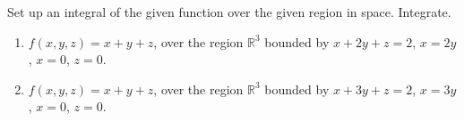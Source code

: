 Set up an integral of the given function over the given region in space. Integrate.
\begin{enumerate}
\item $f(x,y,z)=x+y+z$, over the region $\mathbb R^3$ bounded by $ x + 2y+z=2$, $x=2y$, $x=0$, $z=0$.
\item \label{problemIntegratex+y+zoverx+3y+z=2,x=0,z=0,x=3y} $f(x,y,z)=x+y+z$, over the region $\mathbb R^3$ bounded by $ x + 3y+z=2$, $x=3y$, $x=0$, $z=0$.
\end{enumerate}

